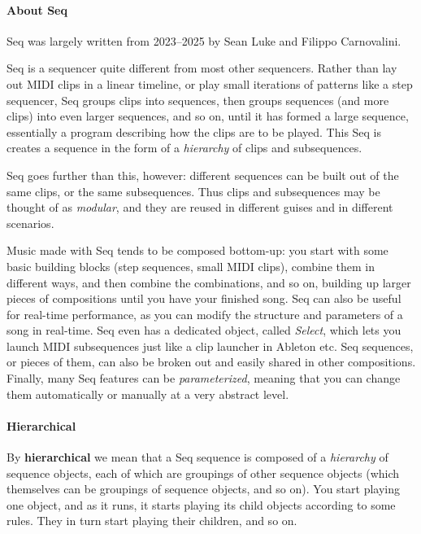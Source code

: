 \documentclass[twoside,10pt]{article}
\begin{document}
\paragraph{About Seq} 
Seq was largely written from 2023--2025 by Sean Luke and Filippo Carnovalini.

Seq is a sequencer quite different from most other sequencers.  Rather than lay out MIDI clips in a linear timeline, or play small iterations of patterns like a step sequencer, Seq groups clips into sequences, then groups sequences (and more clips) into even larger sequences, and so on, until it has formed a large sequence, essentially a program describing how the clips are to be played.  This Seq is creates a sequence in the form of a {\it hierarchy} of clips and subsequences.

Seq goes further than this, however: different sequences can be built out of the same clips, or the same subsequences.  Thus clips and subsequences may be thought of as {\it modular}, and they are reused in different guises and in different scenarios.  

Music made with Seq tends to be composed bottom-up: you start with some basic building blocks (step sequences, small MIDI clips), combine them in different ways, and then combine the combinations, and so on, building up larger pieces of compositions until you have your finished song.  Seq can also be useful for real-time performance, as you can modify the structure and parameters of a song in real-time.  Seq even has a dedicated object, called {\it Select}, which lets you launch MIDI subsequences just like a clip launcher in Ableton etc.  Seq sequences, or pieces of them, can also be broken out and easily shared in other compositions.  Finally, many Seq features can be {\it parameterized}, meaning that you can change them automatically or manually at a very abstract level.

\paragraph{Hierarchical}
By {\bf hierarchical} we mean that a Seq sequence is composed of a {\it hierarchy} of sequence objects, each of which are groupings of other sequence objects (which themselves can be groupings of sequence objects, and so on).  You start playing one object, and as it runs, it starts playing its child objects according to some rules.  They in turn start playing their children, and so on.
\end{document}
